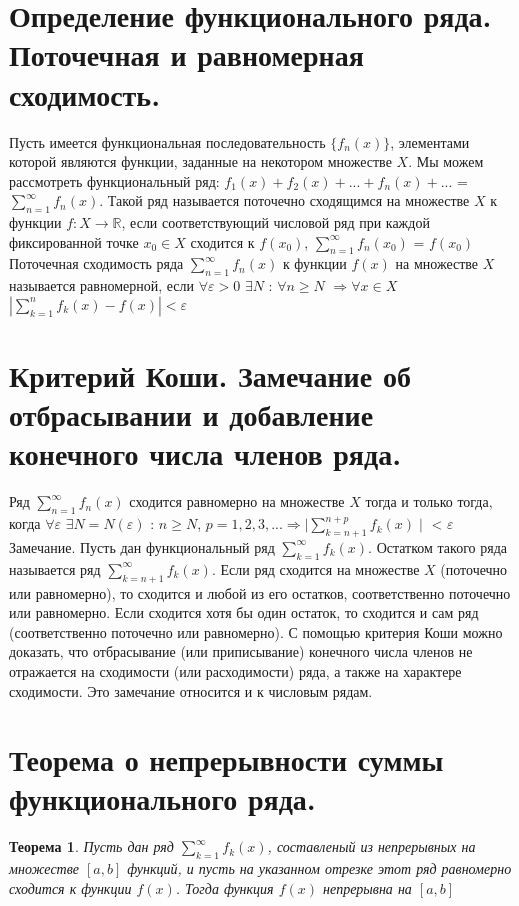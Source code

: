 \documentclass[12pt, a4paper]{article}
\newtheorem{thm}{Теорема}
\begin{document}
\section{Определение функционального ряда. Поточечная и равномерная сходимость.}
Пусть имеется функциональная последовательность $\{f_n(x)\}$, элементами которой являются функции, заданные на некотором множестве $X$. Мы можем рассмотреть функциональный ряд: $f_1(x) + f_2(x) + ... + f_n(x) + ...$ = $\sum\limits_{n=1}^{\infty}f_n(x)$.
\newline
Такой ряд называется поточечно сходящимся на множестве $X$ к функции $f : X \to \mathbb{R}$, если соответствующий числовой ряд при каждой фиксированной точке $x_0 \in X$ сходится к $f(x_0)$, $\sum\limits_{n=1}^{\infty}f_n(x_0)$ = $f(x_0)$ 
\newline
Поточечная сходимость ряда $\sum\limits_{n=1}^{\infty}f_n(x)$ к функции $f(x)$ на множестве $X$ называется равномерной, если $\forall \varepsilon > 0$ $\exists N$ : $\forall n \geq N$ $ \Longrightarrow \forall x \in X$ $|\sum\limits_{k=1}^{n}f_k(x) - f(x)| < \varepsilon$

\section{Критерий Коши. Замечание об отбрасывании и добавление конечного числа членов ряда.}
Ряд $\sum\limits_{n=1}^{\infty}f_n(x)$ сходится равномерно на множестве $X$ тогда и только тогда, когда $\forall \varepsilon$ $\exists N = N(\varepsilon)$ : $n \geq N$, $p = 1, 2, 3, ... \Longrightarrow \mid\sum\limits_{k=n+1}^{n+p}f_k(x) \mid$ < $\varepsilon$
\newline
Замечание. Пусть дан функциональный ряд $\sum\limits_{k=1}^{\infty}f_k(x)$. Остатком такого ряда называется ряд $\sum\limits_{k=n+1}^{\infty}f_k(x)$. Если ряд сходится на множестве $X$ (поточечно или равномерно), то сходится и любой из его остатков, соответственно поточечно или равномерно. Если сходится хотя бы один остаток, то сходится и сам ряд (соответственно поточечно или равномерно).
\newline
С помощью критерия Коши можно доказать, что отбрасывание (или приписывание) конечного числа членов не отражается на сходимости (или расходимости) ряда, а также на характере сходимости. Это замечание относится и к числовым рядам.

\section{Теорема о непрерывности суммы функционального ряда.}
\begin{thm}
	Пусть дан ряд $\sum\limits_{k=1}^{\infty}f_k(x)$, составленый из непрерывных на множестве $[a, b]$ функций, и пусть на указанном отрезке этот ряд равномерно сходится к функции $f(x)$. Тогда функция $f(x)$ непрерывна на $[a, b]$
\end{thm}
\end{document}
